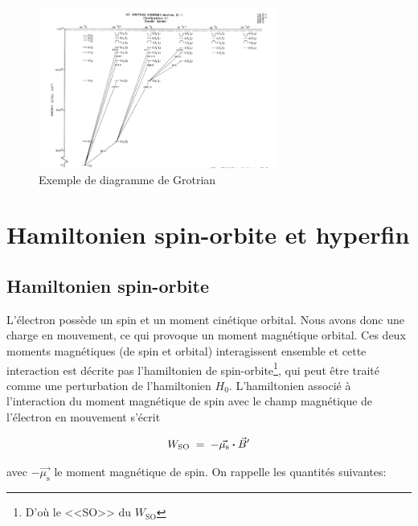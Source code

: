 \begin{figure}[htp]
    \centering
    \includegraphics[width=0.7\textwidth]{Images2/grotrian.PNG}
    \caption{Exemple de diagramme de Grotrian}
    \label{fig:grotrian}
\end{figure}



\newpage
\section{Hamiltonien spin-orbite et hyperfin}
\subsection{Hamiltonien spin-orbite}


L'électron possède un spin et un moment cinétique orbital. Nous avons donc une charge en mouvement, ce qui provoque un moment magnétique orbital. Ces deux moments magnétiques (de spin et orbital) interagissent ensemble et cette interaction est décrite pas l'hamiltonien de spin-orbite\footnote{D'où le <<SO>> du $W_\text{SO}$}, qui peut être traité comme une perturbation de l'hamiltonien $H_0$. L'hamiltonien associé à l'interaction du moment magnétique de spin avec le champ magnétique de l’électron en mouvement s'écrit

\[
    W_\text{SO} \; = \;  -\vec{\mu_\text{s}}\boldsymbol{\cdot}\vec{B}'
\]

avec $-\vec{\mu_\text{s}}$ le moment magnétique de spin. On rappelle les quantités suivantes:

